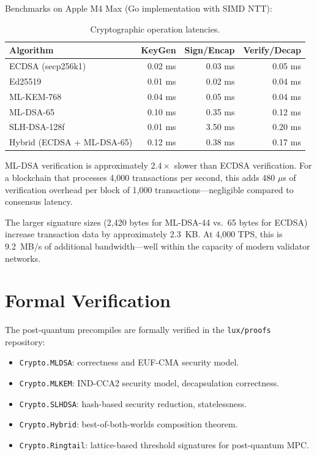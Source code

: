 \documentclass[11pt,a4paper]{article}
\begin{document}
Benchmarks on Apple M4 Max (Go implementation with SIMD NTT):

\begin{table}[h]
\centering
\begin{tabular}{lrrr}
\toprule
\textbf{Algorithm} & \textbf{KeyGen} & \textbf{Sign/Encap} &
\textbf{Verify/Decap} \\
\midrule
ECDSA (secp256k1) & 0.02 ms & 0.03 ms & 0.05 ms \\
Ed25519 & 0.01 ms & 0.02 ms & 0.04 ms \\
\midrule
ML-KEM-768 & 0.04 ms & 0.05 ms & 0.04 ms \\
ML-DSA-65 & 0.10 ms & 0.35 ms & 0.12 ms \\
SLH-DSA-128f & 0.01 ms & 3.50 ms & 0.20 ms \\
\midrule
Hybrid (ECDSA + ML-DSA-65) & 0.12 ms & 0.38 ms & 0.17 ms \\
\bottomrule
\end{tabular}
\caption{Cryptographic operation latencies.}
\label{tab:latency}
\end{table}

ML-DSA verification is approximately $2.4\times$ slower than ECDSA
verification.  For a blockchain that processes 4,000 transactions per
second, this adds 480 $\mu$s of verification overhead per block of
1,000 transactions---negligible compared to consensus latency.

The larger signature sizes (2,420 bytes for ML-DSA-44 vs.\ 65 bytes
for ECDSA) increase transaction data by approximately 2.3~KB.  At
4,000 TPS, this is 9.2~MB/s of additional bandwidth---well within the
capacity of modern validator networks.

\section{Formal Verification}
\label{sec:formal}

The post-quantum precompiles are formally verified in the
\texttt{lux/proofs} repository:

\begin{itemize}[nosep]
  \item \texttt{Crypto.MLDSA}: correctness and EUF-CMA security model.
  \item \texttt{Crypto.MLKEM}: IND-CCA2 security model, decapsulation
        correctness.
  \item \texttt{Crypto.SLHDSA}: hash-based security reduction,
        statelessness.
  \item \texttt{Crypto.Hybrid}: best-of-both-worlds composition
        theorem.
  \item \texttt{Crypto.Ringtail}: lattice-based threshold signatures
        for post-quantum MPC.
\end{itemize}
\end{document}
